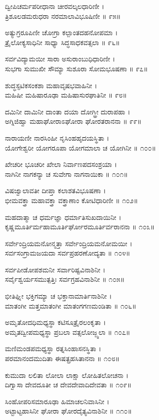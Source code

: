 ದ್ವೀಪಿಚರ್ಮಪರೀಧಾನಾ ಚೀರವಲ್ಕಲಧಾರಿಣೀ ।\\
ತ್ರಿಶೂಲಡಮರುಧರಾ ನರಮಾಲಾವಿಭೂಷಿಣೀ ॥ ೯೫॥

ಅತ್ಯುಗ್ರರೂಪಿಣೀ ಚೋಗ್ರಾ ಕಲ್ಪಾಂತದಹನೋಪಮಾ ।\\
ತ್ರೈಲೋಕ್ಯಸಾಧಿನೀ ಸಾಧ್ಯಾ ಸಿದ್ಧಸಾಧಕವತ್ಸಲಾ ॥ ೯೬॥

ಸರ್ವವಿದ್ಯಾಮಯೀ ಸಾರಾ ಅಸುರಾಂಬುಧಿಧಾರಿಣೀ ।\\
ಸುಭಗಾ ಸುಮುಖೀ ಸೌಮ್ಯಾ ಸುಶೂರಾ ಸೋಮಭೂಷಣಾ ॥ ೯೭॥

ಶುದ್ಧಸ್ಫಟಿಕಸಂಕಶಾ ಮಹಾವೃಷಭವಾಹಿನೀ ।\\
ಮಹಿಷೀ ಮಹಿಷಾರೂಢಾ ಮಹಿಷಾಸುರಘಾತಿನೀ ॥ ೯೮॥

ದಮಿನೀ ದಾಮಿನೀ ದಾಂತಾ ದಯಾ ದೋಗ್ಧ್ರೀ ದುರಾಪಹಾ ।\\
ಅಗ್ನಿಜಿಹ್ವಾ ಮಹಾಘೋರಾಽಘೋರಾ ಘೋರತರಾನನಾ ॥ ೯೯॥

ನಾರಾಯಣೀ ನಾರಸಿಂಹೀ ನೃಸಿಂಹಹೃದಯಸ್ಥಿತಾ ।\\
ಯೋಗೇಶ್ವರೀ ಯೋಗರೂಪಾ ಯೋಗಮಾಲಾ ಚ ಯೋಗಿನೀ ॥ ೧೦೦॥

ಖೇಚರೀ ಭೂಚರೀ ಖೇಲಾ ನಿರ್ವಾಣಪದಸಂಶ್ರಯಾ ।\\
ನಾಗಿನೀ ನಾಗಕನ್ಯಾ ಚ ಸುವೇಗಾ ನಾಗನಾಯಿಕಾ ॥ ೧೦೧॥

ವಿಷಜ್ವಾಲಾವತೀ ದೀಪ್ತಾ ಕಲಾಶತವಿಭೂಷಣಾ ।\\
ಭೀಮವಕ್ತ್ರಾ ಮಹಾವಕ್ತ್ರಾ ವಕ್ತ್ರಾಣಾಂ ಕೋಟಿಧಾರಿಣೀ ॥ ೧೦೨॥

ಮಹದಾತ್ಮಾ ಚ ಧರ್ಮಜ್ಞಾ ಧರ್ಮಾತಿಸುಖದಾಯಿನೀ ।\\
ಕೃಷ್ಣಮೂರ್ತಿರ್ಮಹಾಮೂರ್ತಿರ್ಘೋರಮೂರ್ತಿರ್ವರಾನನಾ ॥ ೧೦೩॥

ಸರ್ವೇಂದ್ರಿಯಮನೋನ್ಮತ್ತಾ ಸರ್ವೇಂದ್ರಿಯಮನೋಮಯೀ ।\\
ಸರ್ವಸಂಗ್ರಾಮಜಯದಾ ಸರ್ವಪ್ರಹರಣೋದ್ಯತಾ ॥ ೧೦೪॥

ಸರ್ವಪೀಡೋಪಶಮನೀ ಸರ್ವಾರಿಷ್ಟವಿನಾಶಿನೀ ।\\
ಸರ್ವೈಶ್ವರ್ಯಸಮುತ್ಪತ್ತಿಃ ಸರ್ವಗ್ರಹವಿನಾಶಿನೀ ॥ ೧೦೫॥

ಭೀತಿಘ್ನೀ ಭಕ್ತಿಗಮ್ಯಾ ಚ ಭಕ್ತಾನಾಮಾರ್ತಿನಾಶಿನೀ ।\\
ಮಾತಂಗೀ ಮತ್ತಮಾತಂಗೀ ಮಾತಂಗಗಣಮಂಡಿತಾ ॥ ೧೦೬॥

ಅಮೃತೋದಧಿಮಧ್ಯಸ್ಥಾ ಕಟಿಸೂತ್ರೈರಲಂಕೃತಾ ।\\
ಅಮೃತದ್ವೀಪಮಧ್ಯಸ್ಥಾ ಪ್ರಬಲಾ ವತ್ಸಲೋಜ್ಜ್ವಲಾ ॥ ೧೦೭॥

ಮಣಿಮಂಡಪಮಧ್ಯಸ್ಥಾ ರತ್ನಸಿಂಹಾಸನಸ್ಥಿತಾ ।\\
ಪರಮಾನಂದಮುದಿತಾ ಈಷತ್ಪ್ರಹಸಿತಾನನಾ ॥ ೧೦೮॥

ಕುಮುದಾ ಲಲಿತಾ ಲೋಲಾ ಲಾಕ್ಷಾ ಲೋಹಿತಲೋಚನಾ ।\\
ದಿಗ್ವಾಸಾ ದೇವದೂತೀ ಚ ದೇವದೇವಾದಿದೇವತಾ ॥ ೧೦೯॥

ಸಿಂಹೋಪರಿಸಮಾರೂಢಾ ಹಿಮಾಚಲನಿವಾಸಿನೀ ।\\
ಅಟ್ಟಾಟ್ಟಹಾಸಿನೀ ಘೋರಾ ಘೋರದೈತ್ಯವಿನಾಶಿನೀ ॥ ೧೧೦॥

